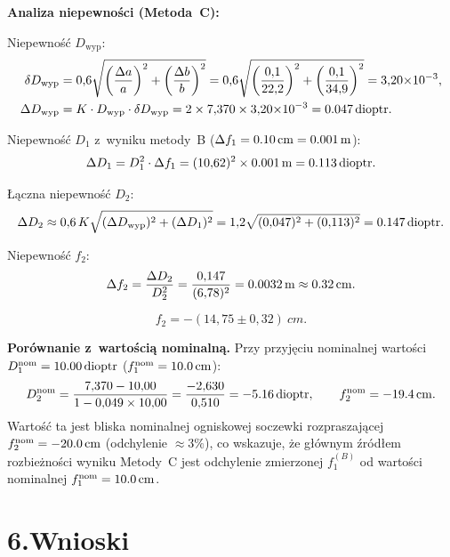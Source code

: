 \documentclass[a4paper,12pt]{article}
\begin{document}
\noindent\textbf{Analiza niepewności (Metoda~C):}

Niepewność $D_\text{wyp}$:
\begin{align*}
  \delta D_\text{wyp} &= 0{,}6\sqrt{\left(\frac{\Delta a}{a}\right)^2
                                   +\left(\frac{\Delta b}{b}\right)^2}
    = 0{,}6\sqrt{\left(\frac{0{,}1}{22{,}2}\right)^2
               +\left(\frac{0{,}1}{34{,}9}\right)^2}
    = 3{,}20{\times}10^{-3}, \\
  \Delta D_\text{wyp} &= K \cdot D_\text{wyp} \cdot \delta D_\text{wyp}
    = 2 \times 7{,}370 \times 3{,}20{\times}10^{-3}
    = \SI{0{,}047}{dioptr}.
\end{align*}

Niepewność $D_1$ z~wyniku metody~B ($\Delta f_1 = \SI{0{,}10}{cm} = \SI{0{,}001}{m}$):
\[
  \Delta D_1 = D_1^2 \cdot \Delta f_1
             = (10{,}62)^2 \times \SI{0{,}001}{m}
             = \SI{0{,}113}{dioptr}.
\]

Łączna niepewność $D_2$:
\[
  \Delta D_2 \approx 0{,}6\,K\sqrt{(\Delta D_\text{wyp})^2 + (\Delta D_1)^2}
             = 1{,}2\sqrt{(0{,}047)^2+(0{,}113)^2}
             = \SI{0{,}147}{dioptr}.
\]

Niepewność $f_2$:
\[
  \Delta f_2 = \frac{\Delta D_2}{D_2^2}
             = \frac{0{,}147}{(6{,}78)^2}
             = \SI{0{,}0032}{m}
             \approx \SI{0{,}32}{cm}.
\]

\[
  \boxed{f_2 = -(14{,}75 \pm 0{,}32)\ \si{cm}.}
\]

\medskip
\noindent\textbf{Porównanie z~wartością nominalną.} Przy przyjęciu nominalnej wartości
$D_1^{\text{nom}} = \SI{10{,}00}{dioptr}$ ($f_1^{\text{nom}} = \SI{10{,}0}{cm}$):
\[
  D_2^{\text{nom}} = \frac{7{,}370 - 10{,}00}{1 - 0{,}049 \times 10{,}00}
                   = \frac{-2{,}630}{0{,}510}
                   = \SI{-5{,}16}{dioptr},
  \qquad
  f_2^{\text{nom}} = \SI{-19{,}4}{cm}.
\]
Wartość ta jest bliska nominalnej ogniskowej soczewki rozpraszającej
$f_2^{\text{nom}} = \SI{-20{,}0}{cm}$ (odchylenie $\approx 3\%$), co wskazuje,
że głównym źródłem rozbieżności wyniku Metody~C jest odchylenie zmierzonej $f_1^{(B)}$
od wartości nominalnej $f_1^{\text{nom}} = \SI{10{,}0}{cm}$.

\section*{6.\quad Wnioski}
\end{document}

